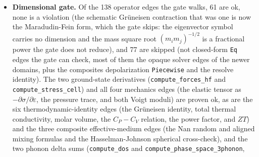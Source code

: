 \documentclass[11pt,a4paper]{article}
\begin{document}
\begin{itemize}[leftmargin=2em, itemsep=0.25em]
        published papers (kaldo 2020, the QHGK/Green-Kubo Isaeva 2019,
        Esfarjani 2011, the 2021 carbon-nanotube and 2025 kappa-limit BTE
        studies, PtSe$_2$ 2021, quantum-elastic PIMD/TDEP 2024, SiGe disorder
        2024, amorphous alloys 2020, the Balandin 2008 graphene
        measurement and the Hou 2025 MoS$_2$ memtransistor arrays). The six
        measurements are the Glassbrenner-Slack 1964
        steady-state thermal conductivities of bulk single-crystal silicon
        ($156\,\mathrm{W/(m\,K)}$) and germanium ($60.2\,\mathrm{W/(m\,K)}$) at
        $300\,\mathrm{K}$ and natural isotopic abundance, the Balandin 2008
        suspended-graphene Raman value, the PtSe$_2$ 2021 in-plane FDTR
        value, and the Hou 2025 UPS work functions of pristine and
        oxygen-plasma-treated MoS$_2$. The four newest
        simulation values (2026-07-18) are fully-specified engine-adapter
        evidence: kaldo and phono3py silicon thermal conductivities, RTA and
        direct-inverse, with every knob in-hash down to the sha256 of the
        vendored Tersoff potential, each paired with a committed conformance
        target (eight targets total) that a re-run must reproduce within its
        stated tolerance.
  \item \textbf{Dimensional gate.} Of the 138 operator edges the gate walks, 61
        are ok, none is a violation (the schematic Gr\"uneisen contraction that
        was one is now the Maradudin-Fein form, which the gate skips: the eigenvector
        symbol carries no dimension and the mass square root $(m_i m_j)^{-1/2}$ is a
        fractional power the gate does not reduce), and 77 are
        skipped (not closed-form
        \texttt{Eq} edges the gate can check, most of them the opaque solver
        edges of the newer domains, plus the composites depolarization
        \texttt{Piecewise} and the resolve identity). The two ground-state
        derivatives
        (\texttt{compute\_forces\_hf} and \texttt{compute\_stress\_cell}) and all
        four mechanics edges (the elastic tensor as
        $-\partial\sigma/\partial\varepsilon$, the pressure trace, and both Voigt
        moduli) are proven ok, as are the six thermodynamic-identity edges (the
        Gr\"uneisen identity, total thermal conductivity, molar volume, the
        $C_P - C_V$ relation, the power factor, and $ZT$) and the three composite
        effective-medium edges (the Nan random and aligned mixing formulas and
        the Hasselman-Johnson spherical cross-check), and the two phonon delta
        sums (\texttt{compute\_dos} and \texttt{compute\_phase\_space\_3phonon},

\end{itemize}
\end{document}
